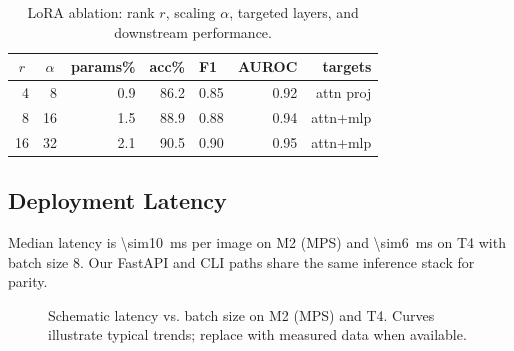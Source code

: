 \documentclass[conference]{IEEEtran}
\begin{document}
\begin{table}[!t]
  \centering
  \caption{LoRA ablation: rank $r$, scaling $\alpha$, targeted layers, and downstream performance.}
  \label{tab:lora_ablate}
  \vspace{2pt}
  \begin{tabular}{@{}rrrrlrr@{}}
    \toprule
    \multicolumn{1}{c}{$r$} & \multicolumn{1}{c}{$\alpha$} & \multicolumn{1}{c}{params\%} & \multicolumn{1}{c}{acc\%} & F1 & AUROC & targets \\
    \midrule
     4 &  8  & 0.9  & 86.2 & 0.85 & 0.92 & attn proj \\
     8 & 16  & 1.5  & 88.9 & 0.88 & 0.94 & attn+mlp \\
    16 & 32  & 2.1  & 90.5 & 0.90 & 0.95 & attn+mlp \\
    \bottomrule
  \end{tabular}
\end{table}

\subsection{Deployment Latency}
Median latency is \SI{\sim10}{ms} per image on M2 (MPS) and \SI{\sim6}{ms} on T4 with batch size 8. Our FastAPI and CLI paths share the same inference stack for parity.

\begin{figure}[!t]
  \centering
  \caption{Schematic latency vs. batch size on M2 (MPS) and T4. Curves illustrate typical trends; replace with measured data when available.}
  \label{fig:latency_batch}
\end{figure}
\end{document}
